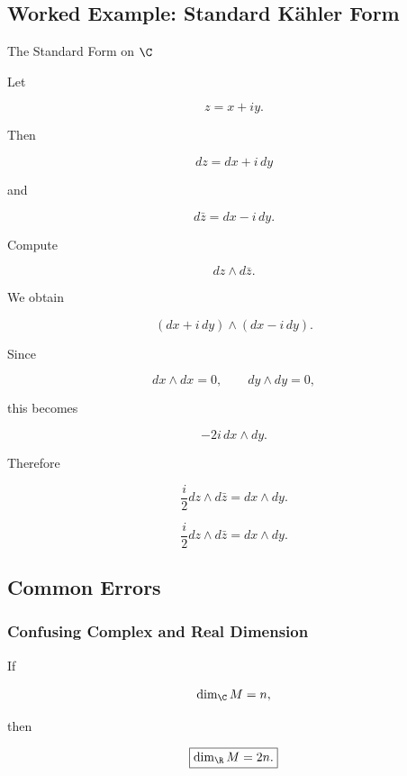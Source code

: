 \subsection{Worked Example: Standard K\"ahler Form}
\label{subsec:worked-standard-kahler}

\begin{workedexamplebox}{The Standard Form on \(\C\)}

Let

\[
z=x+iy.
\]

Then

\[
dz=dx+i\,dy
\]

and

\[
d\bar z=dx-i\,dy.
\]

Compute

\[
dz\wedge d\bar z.
\]

We obtain

\[
(dx+i\,dy)\wedge(dx-i\,dy).
\]

Since

\[
dx\wedge dx=0,
\qquad
dy\wedge dy=0,
\]

this becomes

\[
-2i\,dx\wedge dy.
\]

Therefore

\[
\frac{i}{2}
dz\wedge d\bar z
=
dx\wedge dy.
\]

\begin{answerbox}
\[
\boxed{
\frac{i}{2}
dz\wedge d\bar z
=
dx\wedge dy.
}
\]
\end{answerbox}
\end{workedexamplebox}

\subsection{Common Errors}
\label{subsec:complex-geometry-common-errors}

\subsubsection{Confusing Complex and Real Dimension}

If

\[
\dim_{\C}M=n,
\]

then

\[
\boxed{
\dim_{\R}M=2n.
}
\]

